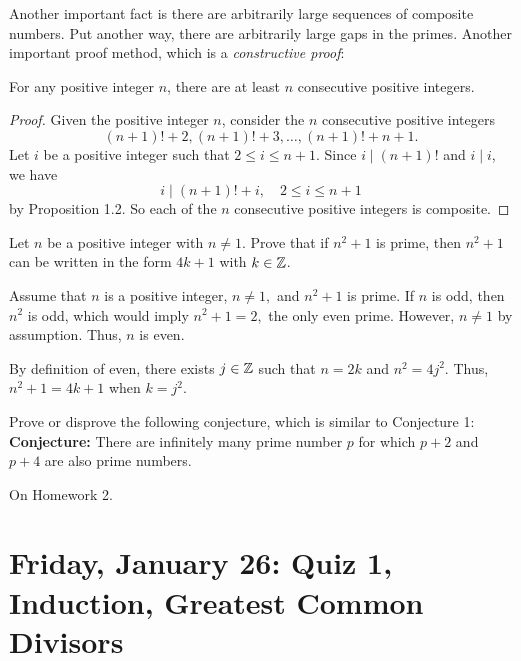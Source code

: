 \documentclass{ximera}
\begin{document}
Another important fact is there are arbitrarily large sequences of composite numbers. Put another way, there are arbitrarily large gaps in the primes. Another important proof method, which is a \emph{constructive proof}:

\begin{prop*}[Proposition 1.8]
 For any positive integer $n$, there are at least $n$ consecutive positive integers.
\end{prop*}
\begin{proof}
 Given the positive integer $n$, consider the $n$ consecutive positive integers \[(n+1)!+2, (n+1)!+3,\dots, (n+1)!+n+1.\]
 Let $i$ be a positive integer such that $2\leq i\leq n+1$. Since $i\mid (n+1)!$ and $i\mid i$, we have \[i\mid(n+1)! +i,\quad 2\leq i\leq n+1\] by Proposition 1.2. So each of the $n$ consecutive positive integers is composite.
\end{proof}

  \begin{br} Let $n$ be a positive integer with $n\neq 1$. Prove that if $n^2+1$ is prime, then $n^2+1$ can be written in the form $4k+1$ with $k\in\mathbb Z$.
  \begin{solution}
   Assume that $n$ is a positive integer, $n\neq 1,$ and $n^2+1$ is prime. If $n$ is odd, then $n^2$ is odd, which would imply $n^2+1=2,$ the only even prime. However, $n\neq 1$ by assumption. Thus, $n$ is even. 

    By definition of even, there exists $j\in\mathbb Z$ such that $n=2k$ and $n^2=4j^2$. Thus, $n^2+1=4k+1$ when $k=j^2.$
  \end{solution}
\end{br}

  \begin{br}
  Prove or disprove the following conjecture, which is similar to Conjecture 1:\\
      \textbf{Conjecture:} There are infinitely many prime number $p$ for which $p+2$ and $p+4$ are also prime numbers.

  
  \begin{solution}
    On Homework 2.
  \end{solution}
    \end{br}



\section{Friday, January 26: Quiz 1, Induction, Greatest Common Divisors}
\end{document}
